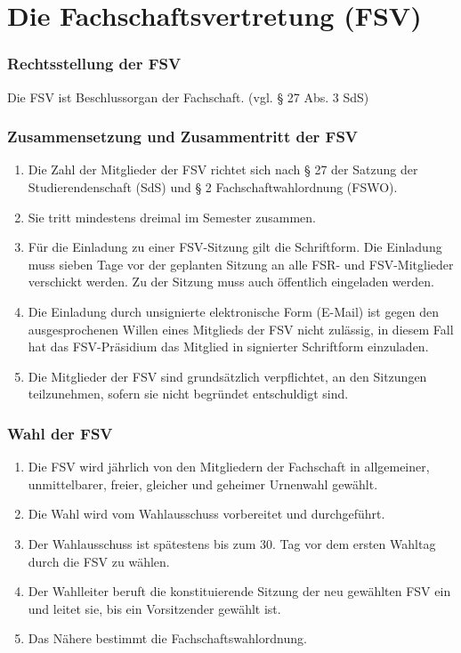 \documentclass{article}
\begin{document}
\part{Die Fachschaftsvertretung (FSV)}
\section{Rechtsstellung der FSV}
Die FSV ist Beschlussorgan der Fachschaft. (vgl. § 27 Abs. 3 SdS)

\section{Zusammensetzung und Zusammentritt der FSV}
\begin{enumerate}[(1)]
\item Die Zahl der Mitglieder der FSV richtet sich nach § 27 der Satzung der Studierendenschaft (SdS) und § 2 Fachschaftwahlordnung (FSWO).
\item Sie tritt mindestens dreimal im Semester zusammen.
\item Für die Einladung zu einer FSV-Sitzung gilt die Schriftform. Die Einladung muss sieben Tage vor der geplanten Sitzung an alle FSR- und FSV-Mitglieder verschickt werden. Zu der Sitzung muss auch öffentlich eingeladen werden.
\item Die Einladung durch unsignierte elektronische Form (E-Mail) ist gegen den ausgesprochenen Willen eines Mitglieds der FSV nicht zulässig, in diesem Fall hat das FSV-Präsidium das Mitglied in signierter Schriftform einzuladen.
\item Die Mitglieder der FSV sind grundsätzlich verpflichtet, an den Sitzungen teilzunehmen, sofern sie nicht begründet entschuldigt sind.
\end{enumerate}

\section{Wahl der FSV}
\begin{enumerate}[(1)]
    \item Die FSV wird jährlich von den Mitgliedern der Fachschaft in allgemeiner, unmittelbarer, freier, gleicher und geheimer Urnenwahl gewählt.
    \item Die Wahl wird vom Wahlausschuss vorbereitet und durchgeführt.
    \item Der Wahlausschuss ist spätestens bis zum 30. Tag vor dem ersten Wahltag durch die FSV zu wählen.
    \item Der Wahlleiter beruft die konstituierende Sitzung der neu gewählten FSV ein und leitet sie, bis ein Vorsitzender gewählt ist.
	\item Das Nähere bestimmt die Fachschaftswahlordnung.
\end{enumerate}
\end{document}
